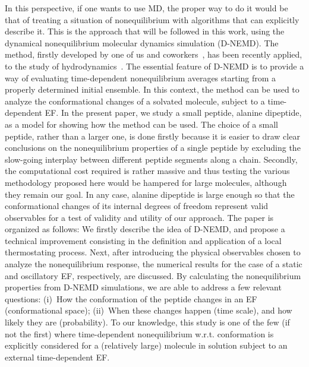 \documentclass[a4paper,preprint,unsortedaddress,onecolumn]{revtex4-1}
\newcommand{\recheck}[1]{{\color{red} #1}}
\begin{document}
In this perspective, if one wants to use MD, the proper way to do it would be that of treating a situation of nonequilibrium with algorithms that can explicitly describe it.
This is the approach that will be followed in this work, using
the dynamical nonequilibrium molecular dynamics simulation (D-NEMD).
The method, firstly developed by one of us and coworkers~\cite{ciccotti1975direct, ciccotti1979thought, ciccotti1993theoretical, palla2008bulk}, 
has been recently applied, to the study of
hydrodynamics~\cite{orlandini2011hydrodynamics,
  orlandini2011hydrodynamics-01}. The essential feature of D-NEMD is to
provide a way of evaluating time-dependent
nonequilibrium averages starting from a properly determined initial ensemble.
In this context, the method can be used to analyze the
conformational changes of a solvated molecule, subject to a time-dependent EF.
In the present paper, we study a small peptide, alanine dipeptide, as a model for showing how the method can be used. 
The choice of a small peptide, rather than a larger one, is done firstly because it
is easier to draw clear conclusions on the nonequilibrium properties
of a single peptide by excluding the slow-going interplay between
different peptide segments along a chain. 
Secondly, the computational cost required is rather massive and thus  testing
the various methodology proposed here would be hampered for large molecules,
although they remain our goal.  \recheck{In any case, alanine dipeptide
is large enough so that the conformational changes of its internal degrees of freedom represent valid observables for a test of validity and utility of our approach.}
The paper is organized as follows:
\recheck{
  We firstly describe the idea of D-NEMD, and propose a technical improvement consisting in the definition and application of a local thermostating process.
Next, after introducing the physical
observables chosen to analyze the nonequilibrium response,
the numerical results for the case of a static and oscillatory EF, respectively, are discussed.} By calculating the nonequilibrium properties from D-NEMD
simulations, we are able to address
a few relevant questions: (i)~How the conformation of the peptide
changes in an EF (conformational space);
(ii)~When these changes happen (time scale),
and how likely they are (probability). 
To our knowledge, this study is one of the few (if not the first)  where
time-dependent nonequilibrium w.r.t. conformation
is explicitly considered for a (relatively large) molecule
in solution subject to an external time-dependent EF.
\end{document}
